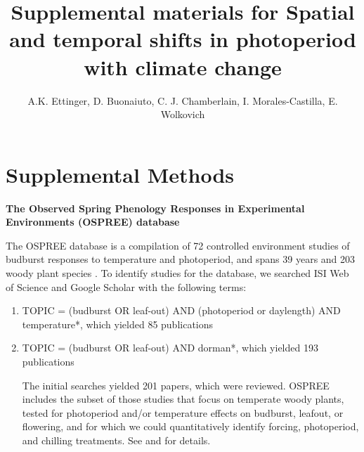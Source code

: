 \documentclass{article}
\begin{document}
 
\title{Supplemental materials for Spatial and temporal shifts in photoperiod with climate change} %

\author{A.K. Ettinger, D. Buonaiuto, C. J. Chamberlain, I. Morales-Castilla, E. Wolkovich}
\maketitle  %


\renewcommand{\thetable}{S\arabic{table}}
\renewcommand{\thefigure}{S\arabic{figure}}

\section*{Supplemental Methods}

\par \textbf{The Observed Spring Phenology Responses in Experimental Environments (OSPREE) database}
\par The OSPREE database is a compilation of 72 controlled environment studies of budburst responses to temperature and photoperiod, and spans 39 years and 203 woody plant species \citep{wolkovich2019}.  To identify studies for the database, we searched ISI Web of Science and Google Scholar with the following terms: 
\begin{enumerate}
\item TOPIC = (budburst OR leaf-out) AND (photoperiod or daylength) AND temperature*, which yielded 85 publications

\item TOPIC = (budburst OR leaf-out) AND dorman*, which yielded 193 publications

The initial searches yielded 201 papers, which were reviewed. OSPREE includes the subset of those studies that focus on temperate woody plants, tested for photoperiod and/or temperature effects on budburst, leafout, or flowering, and for which we could quantitatively identify forcing, photoperiod, and chilling treatments. See \citet{ettinger2020} and \citet{wolkovich2019} for details.

\end{enumerate}
\end{document}
